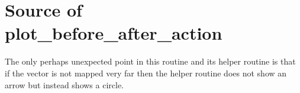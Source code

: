 \section{Source of plot\_before\_after\_action}
The only perhaps unexpected point in this routine and its helper routine
is that if the vector is not mapped very far then the helper
routine does not show an arrow but instead shows a circle.



\endinput

TODO

1) Does python intro show 
   > x, y = 5, 7
construct?
